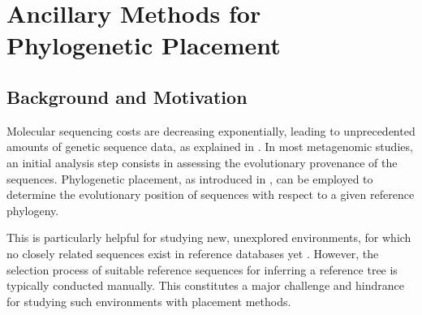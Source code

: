 

\chapter{Ancillary Methods for Phylogenetic Placement}
\label{ch:AutomaticTrees}



\section{Background and Motivation}
\label{ch:AutomaticTrees:sec:Motivation}

Molecular sequencing costs are decreasing exponentially, leading to unprecedented amounts of genetic sequence data,
as explained in .
In most metagenomic studies, an initial analysis step consists in assessing the evolutionary provenance of the sequences.
Phylogenetic placement, as introduced in ,
can be employed to determine the evolutionary position of sequences with respect to a given reference phylogeny.

This is particularly helpful for studying new, unexplored environments,
for which no closely related sequences exist in reference databases yet \cite{Mahe2017}.
However, the selection process of suitable reference sequences
for inferring a reference tree is typically conducted manually.
This constitutes a major challenge and hindrance for studying such environments with placement methods.

